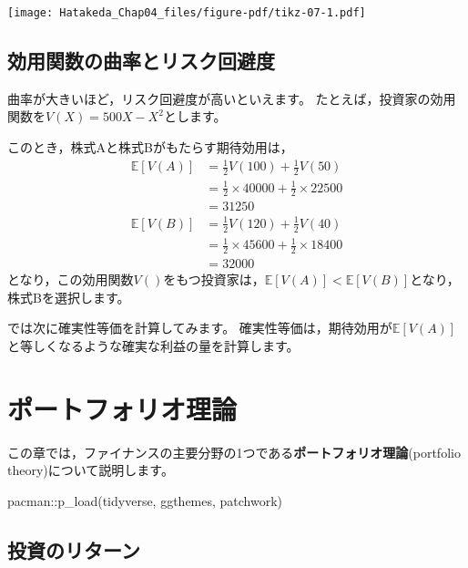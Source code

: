 \documentclass[
  letterpaper,
  pandoc,
  ja=standard,
  jafont = hiragino-pron]{ltjsbook}
\newenvironment{Shaded}{\begin{snugshade}}{\end{snugshade}}
\newcommand{\FunctionTok}[1]{\textcolor[rgb]{0.28,0.35,0.67}{#1}}
\newcommand{\NormalTok}[1]{\textcolor[rgb]{0.00,0.23,0.31}{#1}}
\newcommand{\SpecialCharTok}[1]{\textcolor[rgb]{0.37,0.37,0.37}{#1}}
\begin{document}
\texttt{[image: Hatakeda\_Chap04\_files/figure-pdf/tikz-07-1.pdf]}

\section{効用関数の曲率とリスク回避度}\label{ux52b9ux7528ux95a2ux6570ux306eux66f2ux7387ux3068ux30eaux30b9ux30afux56deux907fux5ea6}

曲率が大きいほど，リスク回避度が高いといえます。
たとえば，投資家の効用関数を\(V(X) = 500 X - X^2\)とします。

このとき，株式Aと株式Bがもたらす期待効用は， \[
\begin{aligned}
\mathbb{E}[V(A)] &= \frac 12 V(100) + \frac 12 V(50)\\
& = \frac 12 \times 40000 + \frac 12 \times 22500\\
& = 31250\\
\mathbb{E}[V(B)] &= \frac 12 V(120) + \frac 12 V(40)\\
& = \frac 12 \times 45600 + \frac 12 \times 18400\\
& = 32000
\end{aligned}
\]
となり，この効用関数\(V()\)をもつ投資家は，\(\mathbb{E}[V(A)]  < \mathbb{E}[V(B)]\)となり，株式Bを選択します。

では次に確実性等価を計算してみます。
確実性等価は，期待効用が\(\mathbb{E}[V(A)]\)と等しくなるような確実な利益の量を計算します。


\chapter{ポートフォリオ理論}\label{ux30ddux30fcux30c8ux30d5ux30a9ux30eaux30aaux7406ux8ad6}

この章では，ファイナンスの主要分野の1つである\textbf{ポートフォリオ理論}(portfolio
theory)について説明します。

\begin{Shaded}
\begin{Highlighting}[]
\NormalTok{pacman}\SpecialCharTok{::}\FunctionTok{p\_load}\NormalTok{(tidyverse, ggthemes, patchwork)}
\end{Highlighting}
\end{Shaded}

\section{投資のリターン}\label{ux6295ux8cc7ux306eux30eaux30bfux30fcux30f3}
\end{document}
